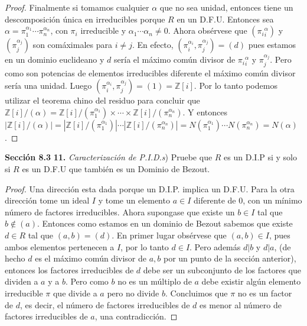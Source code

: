\documentclass[letter,twoside,12pt]{article}
\begin{document}
\begin{enumerate}[label=\textbf{(\alph*)}]
\begin{proof}
Finalmente si tomamos cualquier $ \alpha $ que no sea unidad, entonces tiene un descomposición única en irreducibles porque $ R $ en un D.F.U. Entonces sea $\alpha = \pi_1^{\alpha_1}\cdots \pi_n^{\alpha_n}$, con $ \pi_i $ irreducible y $ \alpha_1\cdots \alpha_n \not = 0 $. Ahora obsérvese que $ (\pi_i{^\alpha_i}) $ y $ (\pi_j^{\alpha_j}) $ son comáximales para $ i \not = j $. En efecto, $ (\pi_i^{\alpha_i},\pi_j^{\alpha_j})=(d) $ pues estamos en un dominio euclideano y $ d $ sería el máximo común divisor de $ \pi_i{^\alpha_i} $ y $ \pi_j^{\alpha_j}$. Pero como son potencias de elementos irreducibles diferente el máximo común divisor sería una unidad. Luego  $ (\pi_i^{\alpha_i},\pi_j^{\alpha_j})=(1)=\mathbb{Z}[i] $. Por lo tanto podemos utilizar el teorema chino del residuo para concluir que $ \mathbb{Z}[i]/(\alpha) = \mathbb{Z}[i]/(\pi_{1}^{\alpha_1}) \times \cdots \times \mathbb{Z}[i]/(\pi_{n}^{\alpha_n})  $. Y entonces $ |\mathbb{Z}[i]/(\alpha)| = |\mathbb{Z}[i]/(\pi_{1}^{\alpha_1})|\cdots |\mathbb{Z}[i]/(\pi_{n}^{\alpha_n})|= N(\pi_{1}^{\alpha_1})\cdots N(\pi_{n}^{\alpha_n}) =N(\alpha) $. 


\end{proof}
\end{enumerate}
\newpage \textbf{Sección 8.3} \textbf{11.}
\textit{Caracterización de P.I.D.s}) Pruebe que $ R $ es un D.I.P si y solo si $ R $ es un D.F.U que también es un Dominio de Bezout.
\begin{proof}
Una dirección esta dada porque un D.I.P. implica un D.F.U. Para la otra dirección tome un ideal $ I $ y tome un elemento $ a \in I$ diferente de 0, con un mínimo número de factores irreducibles. Ahora supongase que existe un $ b \in I $ tal que $ b \not \in (a) $. Entonces como estamos en un dominio de Bezout sabemos que existe $ d \in R $ tal que $ (a,b) = (d) $. En primer lugar obsérvese que $ (a,b) \in I $, pues ambos elementos pertenecen a $ I $, por lo tanto $d \in I$. Pero además $d|b$ y $d|a$, (de hecho $d$ es el máximo común divisor de $ a,b $ por un punto de la sección anterior), entonces los factores irreducibles de $d$ debe ser un subconjunto de los factores que dividen a $a$ y a $b$. Pero como $b$ no es un múltiplo de $a$ debe existir algún elemento irreducible $ \pi $ que divide a $ a $ pero no divide $ b $. Concluimos que $ \pi$ no es un factor de $d$, es decir, el número de factores irreducibles de $d$ es menor al número de factores irreducibles de $a$, una contradicción.
\end{proof}
\end{document}
